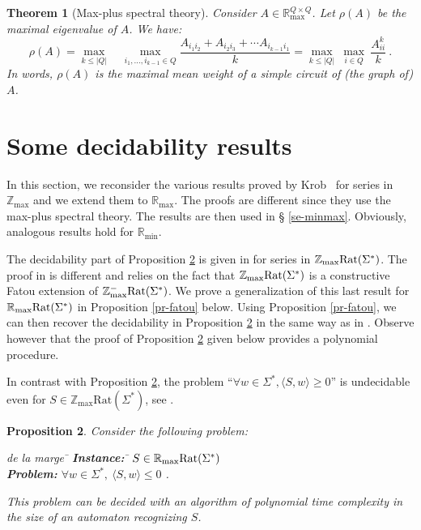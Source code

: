 \documentclass{article}
\newtheorem{thrm}{Theorem}[section]
\newtheorem{prpstn}[thrm]{Proposition}
\newcommand{\mrm}[1]{\text{\rm #1}}
\newcommand{\Z} {\ensuremath{\mathbb{Z}}}
\newcommand{\R} {\ensuremath{\mathbb{R}}}
\newcommand{\Zmax} {\Z_{\max}}
\newcommand{\Rmin} {\R_{\min}}
\newcommand{\Rmax} {\R_{\max}}
\newcommand{\1}{\mathbb{1}}
\newcommand{\0}{\mathbb{0}}
\newcommand{\coef}[2]{\langle #1, #2\rangle}
\def\Rat{\text{Rat}}
\def\ab{\Sigma}
\begin{document}
\begin{thrm}[Max-plus spectral theory]\label{th-spectral}
Consider $A\in \Rmax^{Q\times Q}$. Let  $\rho(A)$ be the maximal eigenvalue
of $A$. We have:
\[
\rho(A) = \max_{k \leq |Q|} \quad \max_{i_1,\dots, i_{k-1}\in Q} \frac{A_{i_1i_2}+
   A_{i_2i_3} + \cdots A_{i_{k-1}i_1}}{k}= \max_{k \leq |Q|} \ 
   \max_{i\in Q} \ \frac{A^k_{ii}}{k}\:.
\]
In words, $\rho(A)$ is the maximal mean weight of a simple circuit of
(the graph of) $A$. \end{thrm}

\section{Some decidability results}\label{se-krob}

In this section, we reconsider the various results proved by
Krob~\cite{krob94} for series in $\Zmax$ and we extend
them to $\Rmax$. The proofs are different since they use
the max-plus spectral theory. The results are then used in \S
\ref{se-minmax}. Obviously, analogous results hold for $\Rmin$. 

\medskip

The decidability part of Proposition \ref{pr-ineq} is
given in \cite[Corollary 4.3]{krob94} for
series in $\Zmax\mrm{Rat}(\ab^*)$.
The proof in \cite{krob94} is different and relies
on the fact that $\Zmax\mrm{Rat}(\ab^*)$ is a constructive Fatou
extension of $\Zmax^{-}\mrm{Rat}(\ab^*)$. We prove a generalization of
this last 
result for  $\Rmax\mrm{Rat}(\ab^*)$ in Proposition
\ref{pr-fatou} below. Using Proposition \ref{pr-fatou}, we can then 
recover the decidability in Proposition \ref{pr-ineq} in the same way
as in \cite{krob94}. 
Observe however that the proof of Proposition \ref{pr-ineq} 
given below provides a polynomial
procedure. 

In contrast with Proposition \ref{pr-ineq}, the problem ``$\forall w\in \ab^*,  
\coef{S}{w} \geq 0$'' is undecidable even for $S \in \Zmax\Rat(\ab^*)$, see
\cite{krob}. 

\begin{prpstn}
\label{pr-ineq}
Consider the following problem:
\begin{tabbing} 
de la marge \= \kill
\> {\bf Instance:} \hspace*{0.4cm} \= $S\in \Rmax\mrm{Rat}(\ab^*)$ \\
\>  {\bf Problem:} \> $\forall w\in \ab^*,  \
\coef{S}{w} \leq 0$ \:.
\end{tabbing}
This problem can be decided with an algorithm of polynomial time
complexity in the size of an automaton recognizing $S$. 
\end{prpstn}
\end{document}
